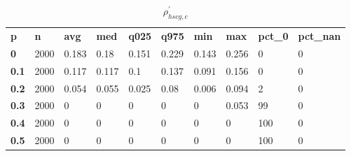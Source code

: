 \begin{table}[h]
 \centering 
\footnotesize
\caption{$\rho_{hscg,c}^\prime $}
\label{tab:alphahscgc}
\begin{tabular}[h]{| l l l l l l l l l l|
    } \hline
\textbf{ p} & \textbf{ n} & \textbf{ avg} & \textbf{ med} & \textbf{ q025} & \textbf{ q975} & \textbf{ min} & \textbf{ max} & \textbf{ pct\_0} & \textbf{ pct\_nan}
           \\
  \textbf{  0} & 2000 & 0.183 &  0.18 & 0.151 & 0.229 & 0.143 & 0.256 &   0 & 0
           \\
  \textbf{0.1} & 2000 & 0.117 & 0.117 &   0.1 & 0.137 & 0.091 & 0.156 &   0 & 0
           \\
  \textbf{0.2} & 2000 & 0.054 & 0.055 & 0.025 &  0.08 & 0.006 & 0.094 &   2 & 0
           \\
  \textbf{0.3} & 2000 &     0 &     0 &     0 &     0 &     0 & 0.053 &  99 & 0
           \\
  \textbf{0.4} & 2000 &     0 &     0 &     0 &     0 &     0 &     0 & 100 & 0
           \\
  \textbf{0.5} & 2000 &     0 &     0 &     0 &     0 &     0 &     0 & 100 & 0
           \\
 \hline \end{tabular}
 \end{table}
